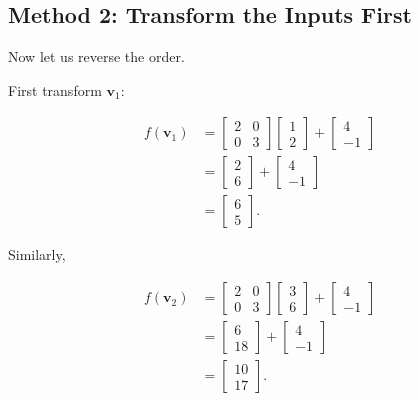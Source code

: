 \documentclass[12pt]{article}
\newcommand{\Vector}[1]{\mathbf{#1}}
\begin{document}
\subsection{Method 2: Transform the Inputs First}
Now let us reverse the order.

First transform $\Vector{v}_1$:

\begin{align*}
f(\Vector{v}_1)
&=
\begin{bmatrix}
2 & 0\\
0 & 3
\end{bmatrix}
\begin{bmatrix}
1\\
2
\end{bmatrix}
+
\begin{bmatrix}
4\\
-1
\end{bmatrix}
\\[6pt]
&=
\begin{bmatrix}
2\\
6
\end{bmatrix}
+
\begin{bmatrix}
4\\
-1
\end{bmatrix}
\\[6pt]
&=
\begin{bmatrix}
6\\
5
\end{bmatrix}.
\end{align*}

Similarly,

\begin{align*}
f(\Vector{v}_2)
&=
\begin{bmatrix}
2 & 0\\
0 & 3
\end{bmatrix}
\begin{bmatrix}
3\\
6
\end{bmatrix}
+
\begin{bmatrix}
4\\
-1
\end{bmatrix}
\\[6pt]
&=
\begin{bmatrix}
6\\
18
\end{bmatrix}
+
\begin{bmatrix}
4\\
-1
\end{bmatrix}
\\[6pt]
&=
\begin{bmatrix}
10\\
17
\end{bmatrix}.
\end{align*}
\end{document}
